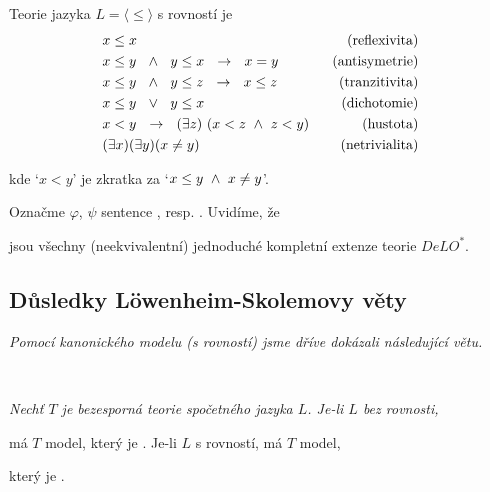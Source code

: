 Teorie   jazyka $L=\langle \le \rangle$ s rovností je
\vspace{-1mm}
\begin{align*} &\mygreen{x\le x} &\text{(\myblue{reflexivita})} \\
&\mygreen{x\le y\ \ \mand\ \ y\le x\ \ \to\ \ x=y}&\text{(\myblue{antisymetrie})}\\
&\mygreen{x\le y\ \ \mand\ \ y \le z\ \ \to\ \ x\le z} &\text{(\myblue{tranzitivita})}\\
&\mygreen{x\le y \ \ \mor\ \ y \le x} \qquad\qquad\quad\ \ &\text{(\myblue{dichotomie})}\\
&\mygreen{x<y \ \ \to\ \ (\exists z)\ (x < z\ \mand\ z < y)} \ \ &\text{(\myblue{hustota})}\\
&\mygreen{(\exists x)(\exists y)(x \ne y)} \ \ &\text{(\myblue{netrivialita})}
\end{align*}

\vspace{-1mm}
kde `$x < y$' je zkratka za `${x \le y\ \land\ x\ne y}$'.
\bigskip

Označme $\varphi$, $\psi$ sentence , resp. . Uvidíme, že
\vspace{-1mm}

\vspace{-5mm}
jsou všechny (neekvivalentní) jednoduché kompletní extenze teorie $DeLO^*$.



\subsection{Důsledky Löwenheim-Skolemovy věty}\todo

{\it Pomocí kanonického modelu (s rovností) jsme dříve dokázali následující větu.}
\medskip

{\bf {}}\ \ {\it Nechť $T$ je bezesporná teorie spočetného jazyka $L$. Je-li $L$ bez rovnosti,
\smallskip

má $T$ model, který je . Je-li $L$ s rovností, má $T$ model,
\smallskip

který je .}
\bigskip

